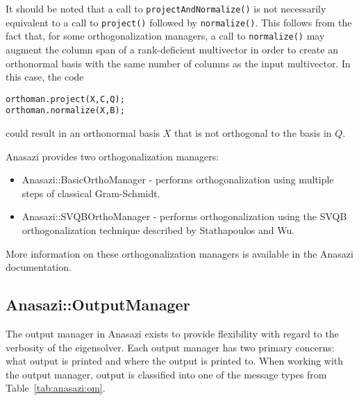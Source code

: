 It should be noted that a call to \verb!projectAndNormalize()! is not necessarily
equivalent to a call to \verb!project()! followed by \verb!normalize()!. This follows from
the fact that, for some orthogonalization managers, a call to \verb!normalize()! may
augment the column span of a rank-deficient multivector in order to create an orthonormal
basis with the same number of columns as the input multivector. In this case, the code
\begin{verbatim}
orthoman.project(X,C,Q);
orthoman.normalize(X,B);
\end{verbatim}
\noindent could result in an orthonormal basis $X$ that is not orthogonal to the basis in $Q$.

Anasazi provides two orthogonalization managers:
\begin{itemize}
  \item Anasazi::BasicOrthoManager - performs orthogonalization using multiple steps of
    classical Gram-Schmidt.
  \item Anasazi::SVQBOrthoManager - performs orthogonalization using the SVQB
    orthogonalization technique described by Stathapoulos and Wu.
\end{itemize}

More information on these orthogonalization managers is available in the Anasazi
documentation.

\subsection{Anasazi::OutputManager}
\label{sec:anasazi:printer}

The output manager in Anasazi exists to provide
flexibility with regard to the verbosity of the eigensolver. Each output manager has
two primary concerns: what output is printed and where the output is printed to.
When working with the output manager, output is classified into one of the 
message types from Table~\ref{tab:anasazi:om}.

